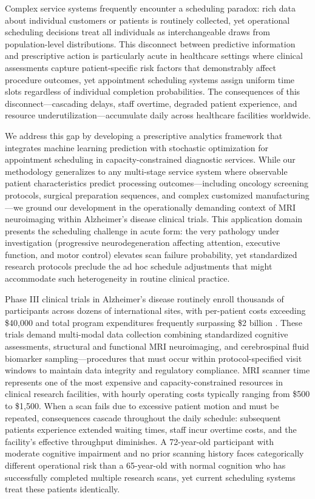 \documentclass[msom,blindrev]{informs3}
\begin{document}
Complex service systems frequently encounter a scheduling paradox: rich data about individual customers or patients is routinely collected, yet operational scheduling decisions treat all individuals as interchangeable draws from population-level distributions. This disconnect between predictive information and prescriptive action is particularly acute in healthcare settings where clinical assessments capture patient-specific risk factors that demonstrably affect procedure outcomes, yet appointment scheduling systems assign uniform time slots regardless of individual completion probabilities. The consequences of this disconnect---cascading delays, staff overtime, degraded patient experience, and resource underutilization---accumulate daily across healthcare facilities worldwide.

We address this gap by developing a prescriptive analytics framework that integrates machine learning prediction with stochastic optimization for appointment scheduling in capacity-constrained diagnostic services. While our methodology generalizes to any multi-stage service system where observable patient characteristics predict processing outcomes---including oncology screening protocols, surgical preparation sequences, and complex customized manufacturing---we ground our development in the operationally demanding context of MRI neuroimaging within Alzheimer's disease clinical trials. This application domain presents the scheduling challenge in acute form: the very pathology under investigation (progressive neurodegeneration affecting attention, executive function, and motor control) elevates scan failure probability, yet standardized research protocols preclude the ad hoc schedule adjustments that might accommodate such heterogeneity in routine clinical practice.

Phase III clinical trials in Alzheimer's disease routinely enroll thousands of participants across dozens of international sites, with per-patient costs exceeding \$40,000 and total program expenditures frequently surpassing \$2 billion \citep{cummings2014clinical}. These trials demand multi-modal data collection combining standardized cognitive assessments, structural and functional MRI neuroimaging, and cerebrospinal fluid biomarker sampling---procedures that must occur within protocol-specified visit windows to maintain data integrity and regulatory compliance. MRI scanner time represents one of the most expensive and capacity-constrained resources in clinical research facilities, with hourly operating costs typically ranging from \$500 to \$1,500. When a scan fails due to excessive patient motion and must be repeated, consequences cascade throughout the daily schedule: subsequent patients experience extended waiting times, staff incur overtime costs, and the facility's effective throughput diminishes. A 72-year-old participant with moderate cognitive impairment and no prior scanning history faces categorically different operational risk than a 65-year-old with normal cognition who has successfully completed multiple research scans, yet current scheduling systems treat these patients identically.
\end{document}
